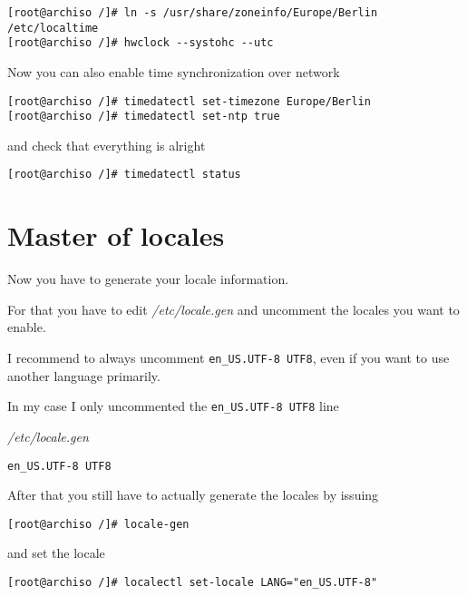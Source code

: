 \documentclass[10pt]{dustdoc}
\begin{document}
\begin{verbatim}
[root@archiso /]# ln -s /usr/share/zoneinfo/Europe/Berlin /etc/localtime
[root@archiso /]# hwclock --systohc --utc
\end{verbatim}

Now you can also enable time synchronization over network

\begin{verbatim}
[root@archiso /]# timedatectl set-timezone Europe/Berlin
[root@archiso /]# timedatectl set-ntp true
\end{verbatim}

\noindent
and check that everything is alright

\begin{verbatim}
[root@archiso /]# timedatectl status
\end{verbatim}

\section{Master of locales}
\label{sec:master-of-locales}

Now you have to generate your locale information.

For that you have to edit \textit{/etc/locale.gen} and uncomment the locales you want to enable.

\begin{NOTE}
    I recommend to always uncomment \texttt{en\_US.UTF-8 UTF8}, even if you want to use another language primarily.
\end{NOTE}

In my case I only uncommented the \texttt{en\_US.UTF-8 UTF8} line

\begin{mintedlisting}
    \caption*{\textit{/etc/locale.gen}}
    \begin{verbatim}
en_US.UTF-8 UTF8
    \end{verbatim}
\end{mintedlisting}

After that you still have to actually generate the locales by issuing

\begin{verbatim}
[root@archiso /]# locale-gen
\end{verbatim}

\noindent
and set the locale

\begin{verbatim}
[root@archiso /]# localectl set-locale LANG="en_US.UTF-8"
\end{verbatim}
\end{document}
